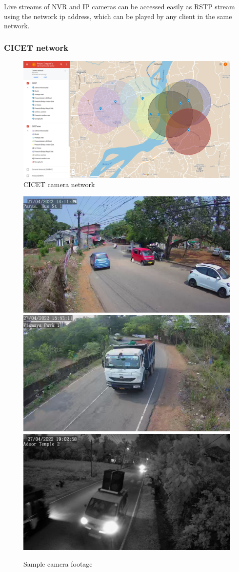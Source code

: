Live streams of NVR and IP cameras can be accessed easily as RSTP stream using the network ip address, which can be played by any client in the same network.


\subsubsection{CICET network}
\begin{figure}[!ht]
	\centering
	\includegraphics[width=\linewidth]{Images/camera-network}
	\caption{CICET camera network}
	\label{fig:camera-network}
\end{figure}

\begin{figure}[!ht]
	\centering
	\includegraphics[width=0.32\linewidth]{Images/camera_footage/footage1} \hfill
	\includegraphics[width=0.32\linewidth]{Images/camera_footage/footage2} \hfill
	\includegraphics[width=0.32\linewidth]{Images/camera_footage/night1} \hfill
	\caption{Sample camera footage}
\end{figure}

